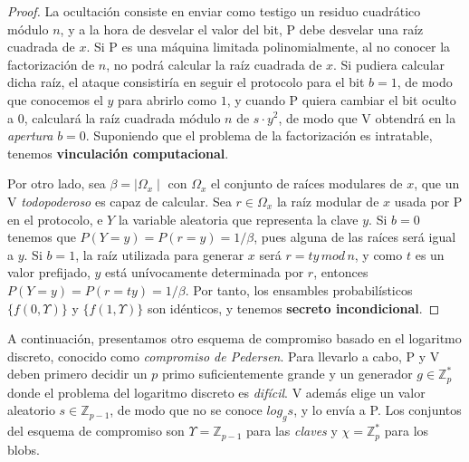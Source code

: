 \begin{proof}
	La ocultación consiste en enviar como testigo un residuo cuadrático módulo $n$, y a la hora de desvelar el valor del bit, P debe desvelar una raíz cuadrada de $x$. Si P es una máquina limitada polinomialmente, al no conocer la factorización de $n$, no podrá calcular la raíz cuadrada de $x$. Si pudiera calcular dicha raíz, el ataque consistiría en seguir el protocolo para el bit $b=1$, de modo que conocemos el $y$ para abrirlo como $1$, y cuando P quiera cambiar el bit oculto a $0$, calculará la raíz cuadrada módulo $n$ de $s\cdot y^2$, de modo que V obtendrá en la \textit{apertura} $b=0$. Suponiendo que el problema de la factorización es intratable, tenemos \textbf{vinculación computacional}.
	
	
	Por otro lado, sea $\beta=\mid \Omega_x \mid$ con $\Omega_x$ el conjunto de raíces modulares de $x$, que un V \textit{todopoderoso} es capaz de calcular.
	Sea $r \in \Omega_x$ la raíz modular de $x$ usada por P en el protocolo, e $Y$ la variable aleatoria que representa la clave $y$. Si $b=0$ tenemos que $P(Y=y)=P(r=y)=1/\beta$, pues alguna de las raíces será igual a $y$. Si $b=1$, la raíz utilizada para generar $x$ será $r=t y\, mod\, n$, y como $t$ es un valor prefijado, $y$ está unívocamente determinada por $r$, entonces $P(Y=y)=P(r=ty)=1/\beta$. Por tanto, los ensambles probabilísticos $\{f(0,\Upsilon)\}$ y $\{f(1,\Upsilon)\}$ son idénticos, y tenemos \textbf{secreto incondicional}.
	
\end{proof}


\hfil


A continuación, presentamos otro esquema de compromiso basado en el logaritmo discreto, conocido como \textit{compromiso de Pedersen}. Para llevarlo a cabo, P y V deben primero decidir un $p$ primo suficientemente grande y un generador $g\in \mathbb{Z}_p^*$ donde el problema del logaritmo discreto es \textit{difícil}. V además elige un valor aleatorio $s\in \mathbb{Z}_{p-1}$, de modo que no se conoce $log_g s$, y lo envía a P. Los conjuntos del esquema de compromiso son $\Upsilon = \mathbb{Z}_{p-1}$ para las \textit{claves} y $\chi= \mathbb{Z}_p^*$ para los blobs.





